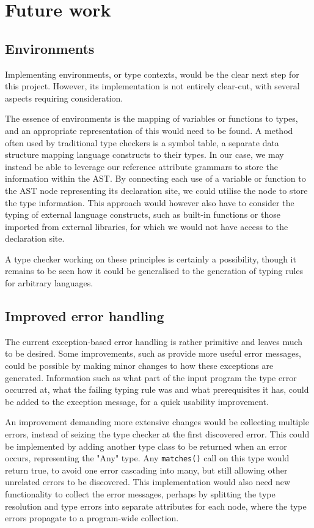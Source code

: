 \documentclass[nofilelist]{cslthse-msc}
\begin{document}
\section{Future work}
\subsection{Environments}
Implementing environments, or type contexts, would be the clear next step for this project.
However, its implementation is not entirely clear-cut, with several aspects requiring consideration.

The essence of environments is the mapping of variables or functions to types, and an appropriate representation of this would need to be found.
A method often used by traditional type checkers is a symbol table, a separate data structure mapping language constructs to their types.
In our case, we may instead be able to leverage our reference attribute grammars to store the information within the AST.
By connecting each use of a variable or function to the AST node representing its declaration site, we could utilise the node to store the type information.
This approach would however also have to consider the typing of external language constructs, such as built-in functions or those imported from external libraries, for which we would not have access to the declaration site.


A type checker working on these principles is certainly a possibility, though it remains to be seen how it could be generalised to the generation of typing rules for arbitrary languages.

\subsection{Improved error handling}
The current exception-based error handling is rather primitive and leaves much to be desired.
Some improvements, such as provide more useful error messages, could be possible by making minor changes to how these exceptions are generated.
Information such as what part of the input program the type error occurred at, what the failing typing rule was and what prerequisites it has, could be added to the exception message, for a quick usability improvement.

An improvement demanding more extensive changes would be collecting multiple errors, instead of seizing the type checker at the first discovered error.
This could be implemented by adding another type class to be returned when an error occurs, representing the "Any" type.
Any \verb|matches()| call on this type would return true, to avoid one error cascading into many, but still allowing other unrelated errors to be discovered.
This implementation would also need new functionality to collect the error messages, perhaps by splitting the type resolution and type errors into separate attributes for each node, where the type errors propagate to a program-wide collection.
\end{document}
